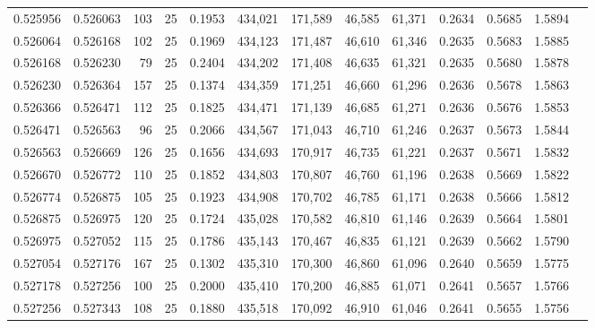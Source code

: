 \begin{tabular}{rrrrrrrrrrrrr}
0.525956 & 0.526063 &   103 &  25 &                                     0.1953 & 434,021 & 171,589 &  46,585 &  61,371 & 0.2634 & 0.5685 & 1.5894 \\
0.526064 & 0.526168 &   102 &  25 &                                     0.1969 & 434,123 & 171,487 &  46,610 &  61,346 & 0.2635 & 0.5683 & 1.5885 \\
0.526168 & 0.526230 &    79 &  25 &                                     0.2404 & 434,202 & 171,408 &  46,635 &  61,321 & 0.2635 & 0.5680 & 1.5878 \\
0.526230 & 0.526364 &   157 &  25 &                                     0.1374 & 434,359 & 171,251 &  46,660 &  61,296 & 0.2636 & 0.5678 & 1.5863 \\
0.526366 & 0.526471 &   112 &  25 &                                     0.1825 & 434,471 & 171,139 &  46,685 &  61,271 & 0.2636 & 0.5676 & 1.5853 \\
0.526471 & 0.526563 &    96 &  25 &                                     0.2066 & 434,567 & 171,043 &  46,710 &  61,246 & 0.2637 & 0.5673 & 1.5844 \\
0.526563 & 0.526669 &   126 &  25 &                                     0.1656 & 434,693 & 170,917 &  46,735 &  61,221 & 0.2637 & 0.5671 & 1.5832 \\
0.526670 & 0.526772 &   110 &  25 &                                     0.1852 & 434,803 & 170,807 &  46,760 &  61,196 & 0.2638 & 0.5669 & 1.5822 \\
0.526774 & 0.526875 &   105 &  25 &                                     0.1923 & 434,908 & 170,702 &  46,785 &  61,171 & 0.2638 & 0.5666 & 1.5812 \\
0.526875 & 0.526975 &   120 &  25 &                                     0.1724 & 435,028 & 170,582 &  46,810 &  61,146 & 0.2639 & 0.5664 & 1.5801 \\
0.526975 & 0.527052 &   115 &  25 &                                     0.1786 & 435,143 & 170,467 &  46,835 &  61,121 & 0.2639 & 0.5662 & 1.5790 \\
0.527054 & 0.527176 &   167 &  25 &                                     0.1302 & 435,310 & 170,300 &  46,860 &  61,096 & 0.2640 & 0.5659 & 1.5775 \\
0.527178 & 0.527256 &   100 &  25 &                                     0.2000 & 435,410 & 170,200 &  46,885 &  61,071 & 0.2641 & 0.5657 & 1.5766 \\
0.527256 & 0.527343 &   108 &  25 &                                     0.1880 & 435,518 & 170,092 &  46,910 &  61,046 & 0.2641 & 0.5655 & 1.5756 \\

\end{tabular}

